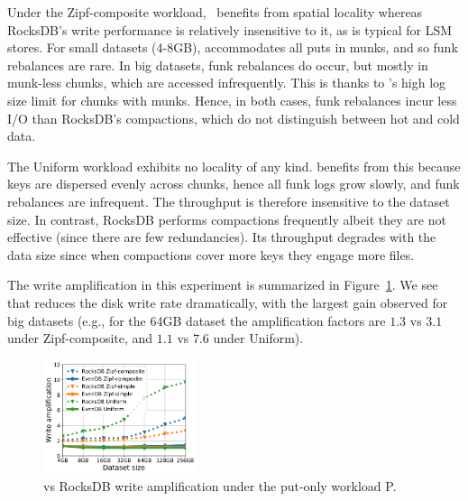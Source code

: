  Under the Zipf-composite workload, \sys\ benefits from spatial locality whereas RocksDB's write performance 
 is relatively insensitive to it, as is typical for LSM stores. For small datasets (4-8GB), \sys\/ accommodates 
all puts in munks, and so funk rebalances are rare. In big datasets, funk rebalances do occur, but mostly in 
munk-less chunks, which are accessed infrequently. This is thanks to \sys\/'s high log size limit for chunks 
with munks. Hence, in both cases, funk rebalances incur less I/O than RocksDB's compactions, 
which do not distinguish between hot and cold data. 

 
The Uniform workload exhibits no locality of any kind. 
 \sys\/ benefits from this because keys are dispersed evenly across chunks, hence all funk logs grow 
 slowly, and funk rebalances are infrequent. The throughput is therefore insensitive to the dataset 
 size. In contrast, RocksDB performs compactions frequently albeit they are not effective (since there are few redundancies). Its throughput 
 degrades  with the data size since when compactions cover more keys they engage more files.
 

   
The write amplification in this experiment is summarized in 
Figure~\ref{fig:writeamp}. We see that \sys\/ reduces the disk write rate dramatically, 
with the largest gain observed for big datasets (e.g.,  for the 64GB dataset 
the amplification factors are $1.3$ vs $3.1$ under Zipf-composite, and $1.1$ vs $7.6$ under Uniform). 

\begin{figure}[t]
	\centering
	\includegraphics[width=0.4\textwidth]{figs/write_amp_p_line.pdf}
	\caption{{\sys\/ vs RocksDB write amplification under the put-only workload P.}}
	\label{fig:writeamp}
\end{figure}

